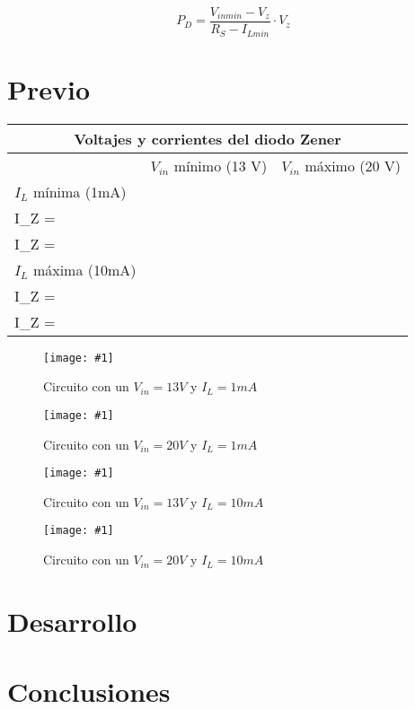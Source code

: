 \documentclass{mylib/reporteConCalif}
\newcommand{\insertImage}[3]{
	\begin{figure}[H]
		\texttt{[image: \#1]}
		\caption{#2}
	\end{figure}
}
\begin{document}
$$P_D = \frac{V_{in min}- V_z}{R_S - I_{L min}} \cdot V_z$$

\newpage
\section{Previo}

\begin{center}
    \begin{tabular}{ | p{4cm} | p{4.5cm} |p{4.5cm} |}
    \hline
    \multicolumn{3}{|c|}{Voltajes y corrientes del diodo Zener} \\
  	\hline

	 & $V_{in}$ mínimo (13 V) & $V_{in}$ máximo (20 V) \\ \hline
	
	$I_L$ mínima (1mA) & \begin{flalign*} V_Z =  \\ I_Z = \end{flalign*} & \begin{flalign*} V_Z =  \\ I_Z = \end{flalign*} \\ \hline
	
	$I_L$ máxima (10mA) & \begin{flalign*} V_Z =  \\ I_Z = \end{flalign*} & \begin{flalign*} V_Z =  \\ I_Z = \end{flalign*}\\ \hline
	
    \end{tabular}
\end{center}

\insertImage{img/labdisp_pract6/one}{Circuito con un $V_{in} = 13 V$ y $I_L = 1 mA$}{8}

\insertImage{img/labdisp_pract6/two}{Circuito con un $V_{in} = 20 V$ y $I_L = 1 mA$}{7}

\insertImage{img/labdisp_pract6/three}{Circuito con un $V_{in} = 13 V$ y $I_L = 10 mA$}{7}

\insertImage{img/labdisp_pract6/four}{Circuito con un $V_{in} = 20 V$ y $I_L = 10 mA$}{7}

\newpage
\section{Desarrollo}


\section{Conclusiones}
\end{document}
